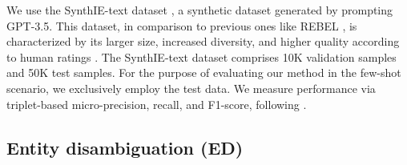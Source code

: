 We use the SynthIE-text dataset \cite{josifoski2023exploiting}, a synthetic dataset generated by prompting GPT-3.5.
This dataset, in comparison to previous ones like REBEL \cite{huguet-cabot-navigli-2021-rebel-relation}, is characterized by its larger size, increased diversity, and higher quality according to human ratings \cite{josifoski2023exploiting}.
The SynthIE-text dataset comprises 10K validation samples and 50K test samples.
For the purpose of evaluating our method in the few-shot scenario, we exclusively employ the test data.
We measure performance via triplet-based micro\hyp precision, recall, and F1-score, following \citet{josifoski-etal-2022-genie}.





\subsection{Entity disambiguation (ED)}


